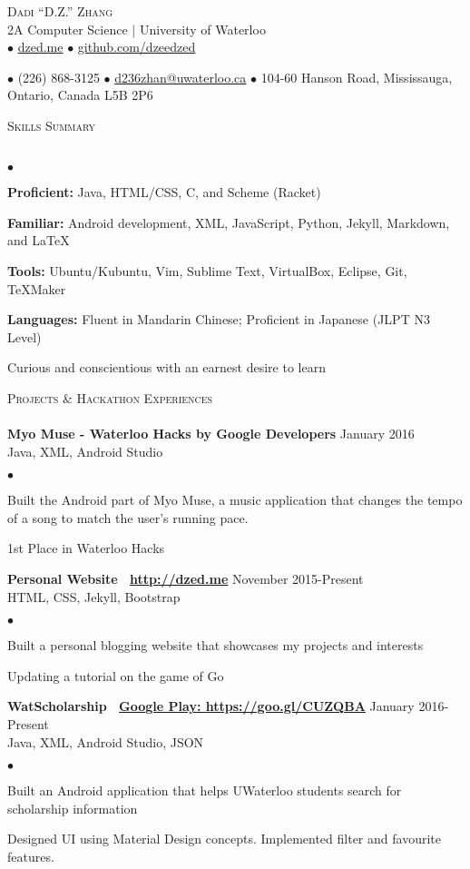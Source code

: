 \documentclass{article}
\newcommand{\lineunder}{\vspace*{-8pt} \\ \hspace*{-18pt} \hrulefill \\}
\newcommand{\header}[1]{{\hspace*{-15pt}\vspace*{6pt} \textsc{#1}} \vspace*{-6pt} \lineunder}
\newcommand{\employer}[3]{{ \textbf{#1} \hfill #2\\ {#3}\\  }}
\newcommand{\contact}[3]{
\begin{center}
{}
\end{center}
\vspace*{-8pt}
\begin{center}
{\LARGE \scshape {#1}}\\
#2\\
#3
\end{center}
\vspace*{-8pt}
}
\newenvironment{achievements}{\begin{list}{$\bullet$}{\topsep 0pt \itemsep -2pt}}{\vspace*{4pt}\end{list}}
\begin{document}
\small
\smallskip
\vspace*{-44pt}

\contact{Dadi ``D.Z.'' Zhang}
{2A Computer Science $\vert$ University of Waterloo}
{$\bullet$ \href{http://dzed.me}{dzed.me}
$\bullet$ \href{http://github.com/dzeedzed}{github.com/dzeedzed}}
{$\bullet$ (226) 868-3125
$\bullet$ \href{mailto:d236zhan@uwaterloo.ca}{d236zhan@uwaterloo.ca}
$\bullet$ 104-60 Hanson Road, Mississauga, Ontario, Canada L5B 2P6}

\hfill \break
\header{Skills Summary}
\begin{achievements}
\item \textbf{Proficient:} Java, HTML/CSS, C, and Scheme (Racket)
\item \textbf{Familiar:} Android development, XML, JavaScript, Python, Jekyll, Markdown, and  \LaTeX\
\item \textbf{Tools:} Ubuntu/Kubuntu, Vim, Sublime Text, VirtualBox, Eclipse, Git, TeXMaker
\item \textbf{Languages:} Fluent in Mandarin Chinese; Proficient in Japanese (JLPT N3 Level)
\item Curious and conscientious with an earnest desire to learn 
\end{achievements}

\header{Projects \& Hackathon Experiences}

\employer{Myo Muse - Waterloo Hacks by Google Developers}{January 2016}{Java, XML, Android Studio}
	\begin{achievements}
	\item Built the Android part of Myo Muse, a music application that changes the tempo of a song to match the user's running pace.
	\item 1st Place in Waterloo Hacks
	\end{achievements}
	
\employer{Personal Website \hspace{5pt} \Mundus~\href{http://dzed.me}{\underline{http://dzed.me}}}{November 2015-Present}{HTML, CSS, Jekyll, Bootstrap}
	\begin{achievements}
	\item Built a personal blogging website that showcases my projects and interests
	\item Updating a tutorial on the game of Go 
	\end{achievements}
	
\employer{WatScholarship \hspace{5pt} \Mundus~\href{https://goo.gl/CUZQBA}{Google Play: \underline{https://goo.gl/CUZQBA}}}{January 2016-Present}{Java, XML, Android Studio, JSON}
	\begin{achievements}
	\item Built an Android application that helps UWaterloo students search for scholarship information
	\item Designed UI using Material Design concepts. Implemented filter and favourite features.
	\end{achievements}
\end{document}
